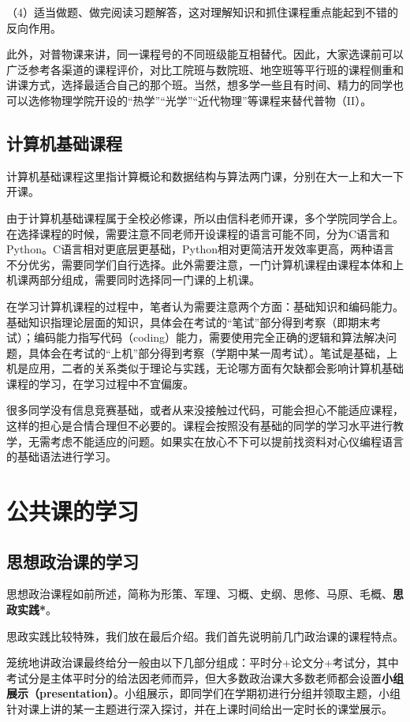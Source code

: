 \documentclass[11pt,oneside]{book}
\begin{document}
（4）适当做题、做完阅读习题解答，这对理解知识和抓住课程重点能起到不错的反向作用。

此外，对普物课来讲，同一课程号的不同班级能互相替代。因此，大家选课前可以广泛参考各渠道的课程评价，对比工院班与数院班、地空班等平行班的课程侧重和讲课方式，选择最适合自己的那个班。当然，想多学一些且有时间、精力的同学也可以选修物理学院开设的“热学”“光学”“近代物理”等课程来替代普物（II）。

        \subsection{计算机基础课程}
        计算机基础课程这里指计算概论和数据结构与算法两门课，分别在大一上和大一下开课。

由于计算机基础课程属于全校必修课，所以由信科老师开课，多个学院同学合上。在选择课程的时候，需要注意不同老师开设课程的语言可能不同，分为C语言和Python。C语言相对更底层更基础，Python相对更简洁开发效率更高，两种语言不分优劣，需要同学们自行选择。此外需要注意，一门计算机课程由课程本体和上机课两部分组成，需要同时选择同一门课的上机课。

在学习计算机课程的过程中，笔者认为需要注意两个方面：基础知识和编码能力。基础知识指理论层面的知识，具体会在考试的“笔试”部分得到考察（即期末考试）；编码能力指写代码（coding）能力，需要使用完全正确的逻辑和算法解决问题，具体会在考试的“上机”部分得到考察（学期中某一周考试）。笔试是基础，上机是应用，二者的关系类似于理论与实践，无论哪方面有欠缺都会影响计算机基础课程的学习，在学习过程中不宜偏废。

很多同学没有信息竞赛基础，或者从来没接触过代码，可能会担心不能适应课程，这样的担心是合情合理但不必要的。课程会按照没有基础的同学的学习水平进行教学，无需考虑不能适应的问题。如果实在放心不下可以提前找资料对心仪编程语言的基础语法进行学习。


    \section{公共课的学习}
        \subsection{思想政治课的学习}
        思想政治课程如前所述，简称为形策、军理、习概、史纲、思修、马原、毛概、\textbf{\textbf{思政实践*}}。

思政实践比较特殊，我们放在最后介绍。我们首先说明前几门政治课的课程特点。

笼统地讲政治课最终给分一般由以下几部分组成：平时分+论文分+考试分，其中考试分是主体平时分的给法因老师而异，但大多数政治课大多数老师都会设置\textbf{\textbf{小组展示（presentation）}}。小组展示，即同学们在学期初进行分组并领取主题，小组针对课上讲的某一主题进行深入探讨，并在上课时间给出一定时长的课堂展示。
\end{document}
